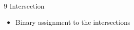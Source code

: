 

\begin{frame}{9 Intersection}
\begin{block}
\begin{itemize}
\item Binary assignment to the intersections
\end{itemize}
\end{block}
\end{frame}
